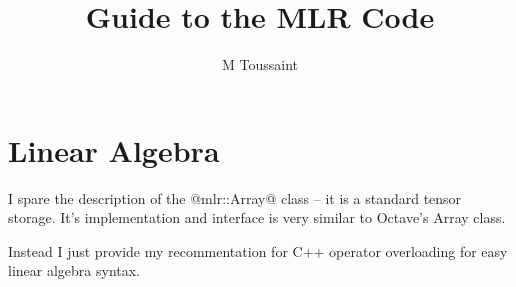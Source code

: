 \documentclass[10pt,fleqn,twoside]{article}
\title{Guide to the MLR Code}
\author{M Toussaint}
\begin{document}
\maketitle

{\footnotesize\tableofcontents

}


\section{Linear Algebra}

I spare the description of the @mlr::Array@ class -- it is a standard
tensor storage. It's implementation and interface is very similar to
Octave's Array class.

Instead I just provide my recommentation for C++ operator overloading
for easy linear algebra syntax.
\end{document}
